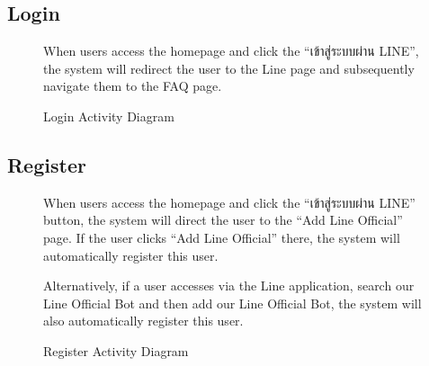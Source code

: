 \documentclass[12pt,oneside,openright,a4paper]{cpe-english-project}
\begin{document}
      \subsection{Login}
      \begin{figure}[!h]
        \centering
        \caption{Login Activity Diagram}\label{fig:AD_Login}
        \begin{flushleft}
          \qquad When users access the homepage and click the “\textthai{เข้าสู่ระบบผ่าน} LINE”, the system will redirect the user to the Line page and subsequently navigate them to the FAQ page. \par
        \end{flushleft}
      \end{figure}
\newpage
      \subsection{Register}
      \begin{figure}[!h]
        \centering
        \caption{Register Activity Diagram}\label{fig:AD_Register}
        \begin{flushleft}
          \qquad When users access the homepage and click the “\textthai{เข้าสู่ระบบผ่าน} LINE” button, the system will direct the user to the “Add Line Official” page. If the user clicks “Add Line Official” there, the system will automatically register this user.  \par
          \qquad Alternatively, if a user accesses via the Line application, search our Line Official Bot and then add our Line Official Bot, the system will also automatically register this user.  \par
        \end{flushleft}
      \end{figure}
\end{document}
